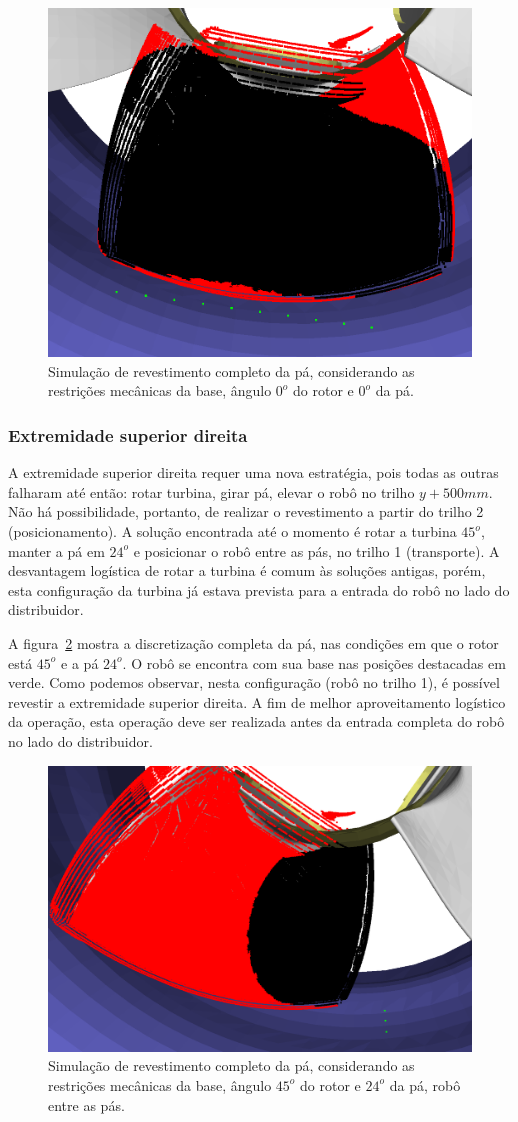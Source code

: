 \begin{figure}[!ht]
	\centering	
	\includegraphics[width=.5\columnwidth]{figs/simcomp1_4.png}
	\caption{Simulação de revestimento completo da pá, considerando as
	restrições mecânicas da base, ângulo $0^o$ do rotor e $0^o$ da pá.}
	\label{fig::simcomp1_4}
\end{figure}

\subsubsection{Extremidade superior direita}
A extremidade superior direita requer uma nova estratégia, pois todas as
outras falharam até então: rotar turbina, girar pá, elevar o robô no trilho
$y+500 mm$. Não há possibilidade, portanto, de realizar o revestimento a partir
do trilho 2 (posicionamento). A solução encontrada até o momento é rotar a
turbina $45^o$, manter a pá em $24^o$ e posicionar o robô entre as pás, no
trilho 1 (transporte). A desvantagem logística de rotar a turbina é comum às
soluções antigas, porém, esta configuração da turbina já estava prevista para
a entrada do robô no lado do distribuidor.

A figura~\ref{fig::simcomp1_7} mostra a discretização completa da pá, nas
condições em que o rotor está $45^o$ e a pá $24^o$. O robô se encontra
com sua base nas posições destacadas em verde. Como podemos observar, nesta
configuração (robô no trilho 1), é possível revestir a extremidade
superior direita. A fim de melhor aproveitamento logístico da
operação, esta operação deve ser realizada antes da entrada completa
do robô no lado do distribuidor.

\begin{figure}[!ht]
	\centering	
	\includegraphics[width=.5\columnwidth]{figs/simcomp1_7.png}
	\caption{Simulação de revestimento completo da pá, considerando as
	restrições mecânicas da base, ângulo $45^o$ do rotor e $24^o$ da pá, robô
	entre as pás.}
	\label{fig::simcomp1_7}
\end{figure}

